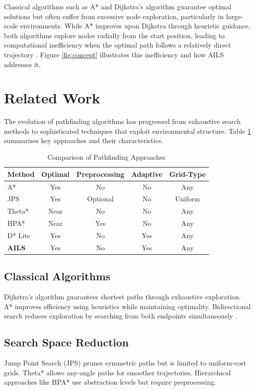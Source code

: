\documentclass[journal]{IEEEtran}
\begin{document}
Classical algorithms such as A* \cite{hart1968formal} and Dijkstra's algorithm \cite{dijkstra1959note} guarantee optimal solutions but often suffer from excessive node exploration, particularly in large-scale environments. While A* improves upon Dijkstra through heuristic guidance, both algorithms explore nodes radially from the start position, leading to computational inefficiency when the optimal path follows a relatively direct trajectory \cite{harabor2011online}. Figure \ref{fig:concept} illustrates this inefficiency and how AILS addresses it.

\section{Related Work}

The evolution of pathfinding algorithms has progressed from exhaustive search methods to sophisticated techniques that exploit environmental structure. Table \ref{tab:comparison} summarizes key approaches and their characteristics.

\begin{table}[h]
\centering
\caption{Comparison of Pathfinding Approaches}
\label{tab:comparison}
\begin{tabular}{lcccc}
\toprule
Method & Optimal & Preprocessing & Adaptive & Grid-Type \\
\midrule
A* & Yes & No & No & Any \\
JPS & Yes & Optional & No & Uniform \\
Theta* & Near & No & No & Any \\
HPA* & Near & Yes & No & Any \\
D* Lite & Yes & No & Yes & Any \\
\textbf{AILS} & Yes & No & Yes & Any \\
\bottomrule
\end{tabular}
\end{table}

\subsection{Classical Algorithms}
Dijkstra's algorithm \cite{dijkstra1959note} guarantees shortest paths through exhaustive exploration. A* \cite{hart1968formal} improves efficiency using heuristics while maintaining optimality. Bidirectional search reduces exploration by searching from both endpoints simultaneously \cite{russell2016artificial}.

\subsection{Search Space Reduction}
Jump Point Search (JPS) \cite{harabor2011online} prunes symmetric paths but is limited to uniform-cost grids. Theta* \cite{nash2007theta} allows any-angle paths for smoother trajectories. Hierarchical approaches like HPA* \cite{botea2004near} use abstraction levels but require preprocessing.
\end{document}
